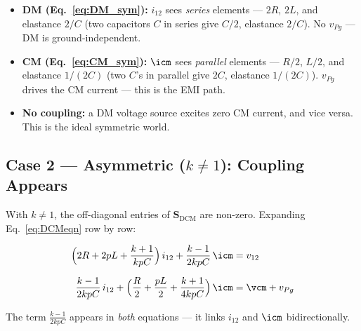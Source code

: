 \begin{circuitbox}
\begin{itemize}
    \item \textbf{DM (Eq.~\ref{eq:DM_sym}):} $i_{12}$ sees
          \emph{series} elements — $2R$, $2L$, and elastance $2/C$
          (two capacitors $C$ in series give $C/2$, elastance $2/C$).
          No $v_{Pg}$ — DM is ground-independent.
    \item \textbf{CM (Eq.~\ref{eq:CM_sym}):} $\icm$ sees
          \emph{parallel} elements — $R/2$, $L/2$, and elastance
          $1/(2C)$ (two $C$'s in parallel give $2C$, elastance $1/(2C)$).
          $v_{Pg}$ drives the CM current — this is the EMI path.
    \item \textbf{No coupling:} a DM voltage source excites zero CM
          current, and vice versa.  This is the ideal symmetric world.
\end{itemize}
\end{circuitbox}

\subsection{Case 2 — Asymmetric ($k \neq 1$): Coupling Appears}

With $k \neq 1$, the off-diagonal entries of $\mathbf{S}_{\mathrm{DCM}}$
are non-zero.  Expanding Eq.~\eqref{eq:DCMeqn} row by row:

\begin{eqnbox}[Asymmetric Coupled Equations ($N = 2$)]
\begin{align}
    \Bigl(2R + 2pL + \frac{k+1}{kpC}\Bigr)\,i_{12}
    + \frac{k-1}{2kpC}\,\icm
        &= v_{12}
        \label{eq:DM_asym} \\[6pt]
    \frac{k-1}{2kpC}\,i_{12}
    + \Bigl(\frac{R}{2} + \frac{pL}{2} + \frac{k+1}{4kpC}\Bigr)\,\icm
        &= \vcm + v_{Pg}
        \label{eq:CM_asym}
\end{align}
\end{eqnbox}

The term $\tfrac{k-1}{2kpC}$ appears in \emph{both} equations —
it links $i_{12}$ and $\icm$ bidirectionally.

